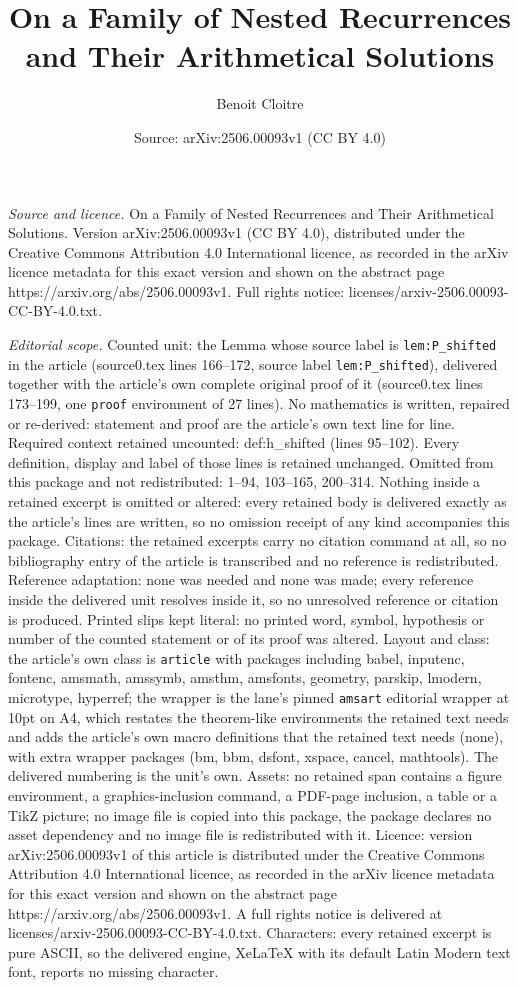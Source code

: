 \documentclass[10pt,a4paper]{amsart}
\title[On a Family of Nested Recurrences and Their Arithmetical Sol]{On a Family of Nested Recurrences and Their Arithmetical Solutions}
\author{Benoit Cloitre}
\date{Source: arXiv:2506.00093v1 (CC BY 4.0)}
\begin{document}
\maketitle

\noindent\emph{Source and licence.} On a Family of Nested Recurrences and Their Arithmetical Solutions. Version arXiv:2506.00093v1 (CC BY 4.0), distributed under the Creative Commons Attribution 4.0 International licence, as recorded in the arXiv licence metadata for this exact version and shown on the abstract page https://arxiv.org/abs/2506.00093v1. Full rights notice: licenses/arxiv-2506.00093-CC-BY-4.0.txt.\par\smallskip

\noindent\textit{Editorial scope.} Counted unit: the Lemma whose source label is \texttt{lem:P\_shifted} in the article (source0.tex lines 166--172, source label \texttt{lem:P\_shifted}), delivered together with the article's own complete original proof of it (source0.tex lines 173--199, one \texttt{proof} environment of 27 lines). No mathematics is written, repaired or re-derived: statement and proof are the article's own text line for line. Required context retained uncounted: def:h\_shifted (lines 95--102). Every definition, display and label of those lines is retained unchanged. Omitted from this package and not redistributed: 1--94, 103--165, 200--314. Nothing inside a retained excerpt is omitted or altered: every retained body is delivered exactly as the article's lines are written, so no omission receipt of any kind accompanies this package. Citations: the retained excerpts carry no citation command at all, so no bibliography entry of the article is transcribed and no reference is redistributed. Reference adaptation: none was needed and none was made; every reference inside the delivered unit resolves inside it, so no unresolved reference or citation is produced. Printed slips kept literal: no printed word, symbol, hypothesis or number of the counted statement or of its proof was altered. Layout and class: the article's own class is \texttt{article} with packages including babel, inputenc, fontenc, amsmath, amssymb, amsthm, amsfonts, geometry, parskip, lmodern, microtype, hyperref; the wrapper is the lane's pinned \texttt{amsart} editorial wrapper at 10pt on A4, which restates the theorem-like environments the retained text needs and adds the article's own macro definitions that the retained text needs (none), with extra wrapper packages (bm, bbm, dsfont, xspace, cancel, mathtools). The delivered numbering is the unit's own. Assets: no retained span contains a figure environment, a graphics-inclusion command, a PDF-page inclusion, a table or a TikZ picture; no image file is copied into this package, the package declares no asset dependency and no image file is redistributed with it. Licence: version arXiv:2506.00093v1 of this article is distributed under the Creative Commons Attribution 4.0 International licence, as recorded in the arXiv licence metadata for this exact version and shown on the abstract page https://arxiv.org/abs/2506.00093v1. A full rights notice is delivered at licenses/arxiv-2506.00093-CC-BY-4.0.txt. Characters: every retained excerpt is pure ASCII, so the delivered engine, XeLaTeX with its default Latin Modern text font, reports no missing character.
\end{document}
